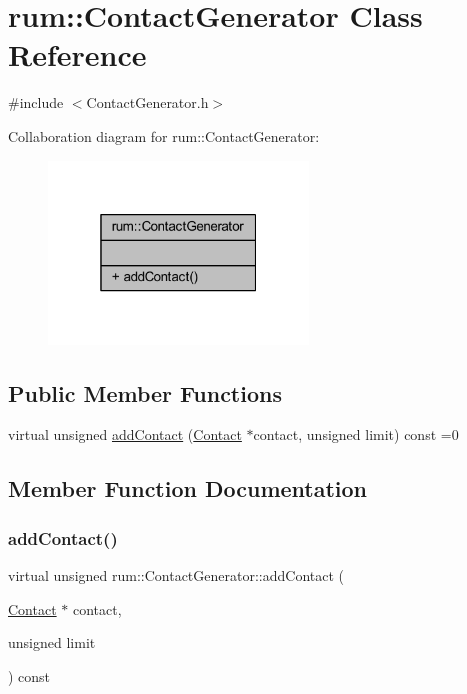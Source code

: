 \hypertarget{classrum_1_1_contact_generator}{}\section{rum\+:\+:Contact\+Generator Class Reference}
\label{classrum_1_1_contact_generator}


{\ttfamily \#include $<$Contact\+Generator.\+h$>$}



Collaboration diagram for rum\+:\+:Contact\+Generator\+:\nopagebreak
\begin{figure}[H]
\begin{center}
\leavevmode
\includegraphics[width=196pt]{classrum_1_1_contact_generator__coll__graph}
\end{center}
\end{figure}
\subsection*{Public Member Functions}
\begin{DoxyCompactItemize}
\item 
virtual unsigned \hyperlink{classrum_1_1_contact_generator_ae1caf36f986a52ed338328cd940fc192}{add\+Contact} (\hyperlink{classrum_1_1_contact}{Contact} $\ast$contact, unsigned limit) const =0
\end{DoxyCompactItemize}


\subsection{Member Function Documentation}
\mbox{\label{classrum_1_1_contact_generator_ae1caf36f986a52ed338328cd940fc192}} 
\subsubsection{\texorpdfstring{add\+Contact()}{addContact()}}
{\footnotesize\ttfamily virtual unsigned rum\+::\+Contact\+Generator\+::add\+Contact (\begin{DoxyParamCaption}\item[{\hyperlink{classrum_1_1_contact}{Contact} $\ast$}]{contact,  }\item[{unsigned}]{limit }\end{DoxyParamCaption}) const\hspace{0.3cm}{\ttfamily [pure virtual]}}



